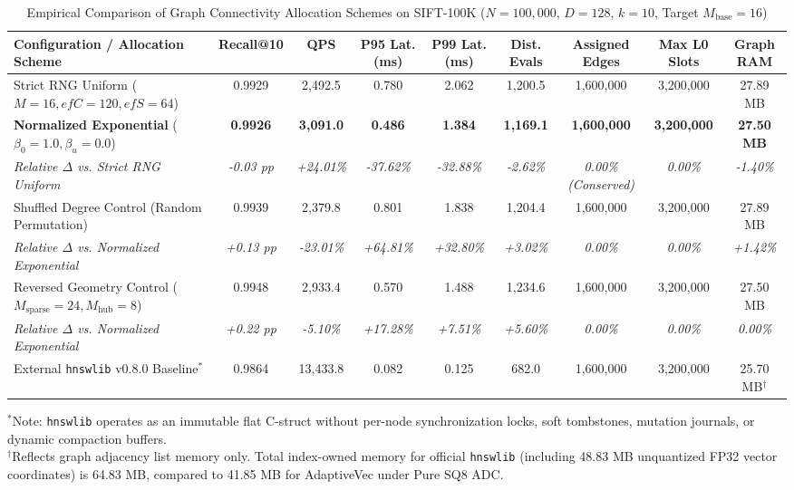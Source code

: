 \begin{table}[t]
\centering
\caption{Empirical Comparison of Graph Connectivity Allocation Schemes on SIFT-100K ($N=100{,}000$, $D=128$, $k=10$, Target $M_{\text{base}}=16$)}
\label{tab:geometry_comparison}
\scriptsize
\begin{tabular}{lcccccccc}
\toprule
\textbf{Configuration / Allocation Scheme} & \textbf{Recall@10} & \textbf{QPS} & \textbf{P95 Lat. (ms)} & \textbf{P99 Lat. (ms)} & \textbf{Dist. Evals} & \textbf{Assigned Edges} & \textbf{Max L0 Slots} & \textbf{Graph RAM} \\
\midrule
Strict RNG Uniform ($M=16, efC=120, efS=64$) & 0.9929 & 2,492.5 & 0.780 & 2.062 & 1,200.5 & 1,600,000 & 3,200,000 & 27.89 MB \\
\textbf{Normalized Exponential} ($\beta_0=1.0, \beta_u=0.0$) & \textbf{0.9926} & \textbf{3,091.0} & \textbf{0.486} & \textbf{1.384} & \textbf{1,169.1} & \textbf{1,600,000} & \textbf{3,200,000} & \textbf{27.50 MB} \\
\rowcolor{gray!10}
\quad \textit{Relative $\Delta$ vs. Strict RNG Uniform} & \textit{-0.03 pp} & \textit{+24.01\%} & \textit{-37.62\%} & \textit{-32.88\%} & \textit{-2.62\%} & \textit{0.00\% (Conserved)} & \textit{0.00\%} & \textit{-1.40\%} \\
Shuffled Degree Control (Random Permutation) & 0.9939 & 2,379.8 & 0.801 & 1.838 & 1,204.4 & 1,600,000 & 3,200,000 & 27.89 MB \\
\rowcolor{gray!10}
\quad \textit{Relative $\Delta$ vs. Normalized Exponential} & \textit{+0.13 pp} & \textit{-23.01\%} & \textit{+64.81\%} & \textit{+32.80\%} & \textit{+3.02\%} & \textit{0.00\%} & \textit{0.00\%} & \textit{+1.42\%} \\
Reversed Geometry Control ($M_{\text{sparse}}=24, M_{\text{hub}}=8$) & 0.9948 & 2,933.4 & 0.570 & 1.488 & 1,234.6 & 1,600,000 & 3,200,000 & 27.50 MB \\
\rowcolor{gray!10}
\quad \textit{Relative $\Delta$ vs. Normalized Exponential} & \textit{+0.22 pp} & \textit{-5.10\%} & \textit{+17.28\%} & \textit{+7.51\%} & \textit{+5.60\%} & \textit{0.00\%} & \textit{0.00\%} & \textit{0.00\%} \\
\midrule
External \texttt{hnswlib} v0.8.0 Baseline$^*$ & 0.9864 & 13,433.8 & 0.082 & 0.125 & 682.0 & 1,600,000 & 3,200,000 & 25.70 MB$^\dagger$ \\
\bottomrule
\end{tabular}
\begin{flushleft}
\scriptsize
$^*$Note: \texttt{hnswlib} operates as an immutable flat C-struct without per-node synchronization locks, soft tombstones, mutation journals, or dynamic compaction buffers. \\
$^\dagger$Reflects graph adjacency list memory only. Total index-owned memory for official \texttt{hnswlib} (including 48.83 MB unquantized FP32 vector coordinates) is 64.83 MB, compared to 41.85 MB for AdaptiveVec under Pure SQ8 ADC.
\end{flushleft}
\end{table}
